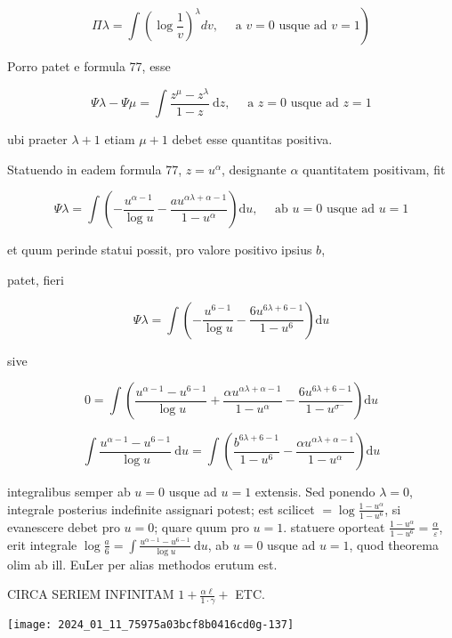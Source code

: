 \documentclass[10pt]{article}
\begin{document}
\[
\left.\Pi \lambda=\int\left(\log \frac{1}{v}\right)^{\lambda} d v, \quad \text { a } v=0 \text { usque ad } v=1\right)
\]

Porro patet e formula 77, esse

\[
\Psi \lambda-\Psi \mu=\int \frac{z^{\mu}-z^{\lambda}}{1-z} \mathrm{~d} z, \quad \text { a } z=0 \text { usque ad } z=1
\]

ubi praeter \(\lambda+1\) etiam \(\mu+1\) debet esse quantitas positiva.

Statuendo in eadem formula 77, \(z=u^{\alpha}\), designante \(\alpha\) quantitatem positivam, fit

\[
\Psi \lambda=\int\left(-\frac{u^{\alpha-1}}{\log u}-\frac{a u^{\alpha \lambda+\alpha-1}}{1-u^{\alpha}}\right) \mathrm{d} u, \quad \text { ab } u=0 \text { usque ad } u=1
\]

et quum perinde statui possit, pro valore positivo ipsius \(b\),

patet, fieri

\[
\Psi \lambda=\int\left(-\frac{u^{6-1}}{\log u}-\frac{6 u^{6 \lambda+6-1}}{1-u^{6}}\right) \mathrm{d} u
\]

sive

\[
0=\int\left(\frac{u^{\alpha-1}-u^{6-1}}{\log u}+\frac{\alpha u^{\alpha \lambda+\alpha-1}}{1-u^{\alpha}}-\frac{6 u^{6 \lambda+6-1}}{1-u^{\sigma^{-}}}\right) \mathrm{d} u
\]

\[
\int \frac{u^{\alpha-1}-u^{6-1}}{\log u} \mathrm{~d} u=\int\left(\frac{b^{6 \lambda+6-1}}{1-u^{6}}-\frac{\alpha u^{\alpha \lambda+\alpha-1}}{1-u^{\alpha}}\right) \mathrm{d} u
\]

integralibus semper ab \(u=0\) usque ad \(u=1\) extensis. Sed ponendo \(\lambda=0\), integrale posterius indefinite assignari potest; est scilicet \(=\log \frac{1-u^{\alpha}}{1-u^{6}}\), si evanescere debet pro \(u=0\); quare quum pro \(u=1\). statuere oporteat \(\frac{1-u^{\alpha}}{1-u^{6}}=\frac{\alpha}{\varepsilon}\), erit integrale \(\log \frac{a}{6}=\int \frac{u^{\alpha-1}-u^{6-1}}{\log u} \mathrm{~d} u\), ab \(u=0\) usque ad \(u=1\), quod theorema olim ab ill. EuLer per alias methodos erutum est.

CIRCA SERIEM INFINITAM \(1+\frac{\alpha \ell}{1 \cdot \gamma}+\) ETC.

\begin{center}
\texttt{[image: 2024\_01\_11\_75975a03bcf8b0416cd0g-137]}
\end{center}
\end{document}
